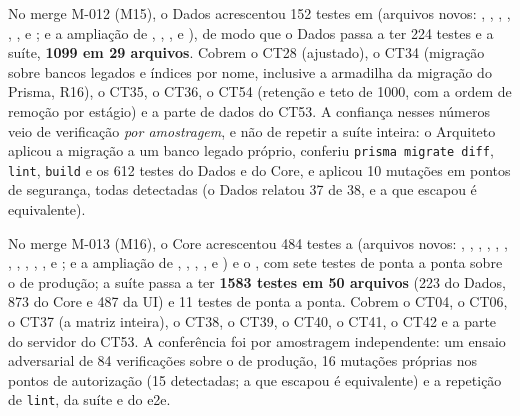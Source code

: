 No merge M-012 (M15), o Dados acrescentou 152 testes em  (arquivos novos: , , , , , ,  e ; e a ampliação de , , ,  e ), de modo que o Dados passa a ter 224 testes e a suíte, \textbf{1099 em 29 arquivos}. Cobrem o CT28 (ajustado), o CT34 (migração sobre bancos legados e índices por nome, inclusive a armadilha da migração do Prisma, R16), o CT35, o CT36, o CT54 (retenção e teto de 1000, com a ordem de remoção por estágio) e a parte de dados do CT53. A confiança nesses números veio de verificação \emph{por amostragem}, e não de repetir a suíte inteira: o Arquiteto aplicou a migração a um banco legado próprio, conferiu \texttt{prisma migrate diff}, \texttt{lint}, \texttt{build} e os 612 testes do Dados e do Core, e aplicou 10 mutações em pontos de segurança, todas detectadas (o Dados relatou 37 de 38, e a que escapou é equivalente).

No merge M-013 (M16), o Core acrescentou 484 testes a  (arquivos novos: , , , , , , , , , , ,  e ; e a ampliação de , , , ,  e ) e o  , com sete testes de ponta a ponta sobre o  de produção; a suíte passa a ter \textbf{1583 testes em 50 arquivos} (223 do Dados, 873 do Core e 487 da UI) e 11 testes de ponta a ponta. Cobrem o CT04, o CT06, o CT37 (a matriz inteira), o CT38, o CT39, o CT40, o CT41, o CT42 e a parte do servidor do CT53. A conferência foi por amostragem independente: um ensaio adversarial de 84 verificações sobre o  de produção, 16 mutações próprias nos pontos de autorização (15 detectadas; a que escapou é equivalente) e a repetição de \texttt{lint}, da suíte e do e2e.

